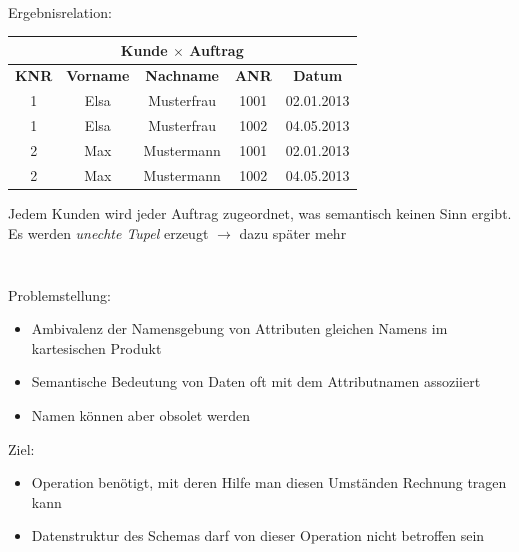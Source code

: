 \begin{frame}\label{frame:kartesischesProduktErgebnis}
\frametitle{\insertsection}
\framesubtitle{\insertsubsection}
\\[8pt]
	Ergebnisrelation:
	\begin{center}
		\begin{tabular}{|c|c|c|c|c|}\hline
			\multicolumn{5}{|c|}{\footnotesize \textbf{Kunde $\times$ Auftrag}}\\\hline\hline
			\footnotesize{\textbf{KNR}} & \footnotesize{\textbf{Vorname}} & \footnotesize{\textbf{Nachname}} 
			  &\footnotesize{\textbf{ANR}} & \footnotesize{\textbf{Datum}}\\\hline
			1 & Elsa & Musterfrau & 1001  & 02.01.2013\\\hline
			1 & Elsa & Musterfrau & 1002 & 04.05.2013\\\hline
			2 & Max & Mustermann & 1001  & 02.01.2013\\\hline
			2 & Max & Mustermann & 1002  & 04.05.2013\\\hline
		\end{tabular}
	\end{center}
	Jedem Kunden wird jeder Auftrag zugeordnet, was semantisch keinen Sinn ergibt.\\
	Es werden \textit{unechte Tupel} erzeugt $\rightarrow$ dazu später mehr
\end{frame}

\begin{frame}\frametitle{\insertsection}
\framesubtitle{\insertsubsection}
\onslide
{}\\[8pt]
Problemstellung:
\begin{itemize}
	\item Ambivalenz der Namensgebung von Attributen gleichen Namens im kartesischen Produkt 
	\item Semantische Bedeutung von Daten oft mit dem Attributnamen assoziiert
	\item Namen k\"onnen aber obsolet werden\\[8pt]
\end{itemize}
\pause
Ziel:
\begin{itemize}
	\item Operation benötigt, mit deren Hilfe man diesen Umst\"anden Rechnung tragen kann
	\item Datenstruktur des Schemas darf von dieser Operation nicht betroffen sein
\end{itemize}
\end{frame}

